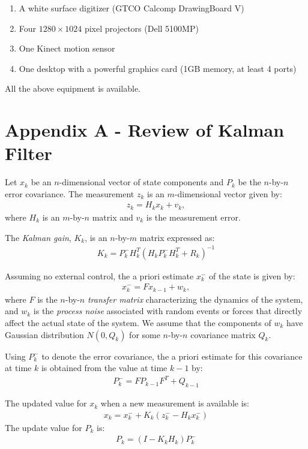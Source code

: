 \begin{enumerate}
  \item A white surface digitizer (GTCO Calcomp DrawingBoard V)
  \item Four $1280\times1024$ pixel projectors (Dell 5100MP)
  \item One Kinect motion sensor
  \item One desktop with a powerful graphics card (1GB memory, at least 4 ports)
\end{enumerate}

All the above equipment is available.

\section{Appendix A - Review of Kalman Filter}
Let $x_k$ be an $n$-dimensional vector of state components and $P_k$ be the
$n$-by-$n$ error covariance. The measurement $z_k$ is an $m$-dimensional
vector given by:
\begin{align*}
z_k = H_kx_k + v_k,
\end{align*}
where $H_k$ is an $m$-by-$n$ matrix and $v_k$ is the measurement error.

The \textit{Kalman gain}, $K_k$, is an $n$-by-$m$ matrix expressed as:
\begin{align*}
K_k = P_k^-H_k^T(H_kP_k^-H_k^T + R_k)^{-1}
\end{align*}

Assuming no external control, the a priori estimate $x_k^-$ of the state is
given by:
\begin{align*}
x_k^- = Fx_{k - 1} + w_k,
\end{align*}
where $F$ is the $n$-by-$n$ \textit{transfer matrix} characterizing the
dynamics of the system, and $w_k$ is the \textit{process noise} associated with
random events or forces that directly affect the actual state of the system. We assume that the components of $w_k$
have Gaussian distribution $N(0, Q_k)$ for some $n$-by-$n$ covariance matrix
$Q_k$.

Using $P_k^-$ to denote the error covariance, the a priori estimate for this
covariance at time $k$ is obtained from the value at time $k - 1$ by:
\begin{align*}
P_k^- = FP_{k - 1}F^T + Q_{k - 1}
\end{align*}

The updated value for $x_k$ when a new measurement is available is:
\begin{align*}
x_k = x_k^- + K_k(z_k^- - H_kx_k^-)
\end{align*}
The update value for $P_k$ is:
\begin{align*}
P_k = (I - K_kH_k)P_k^-
\end{align*}

